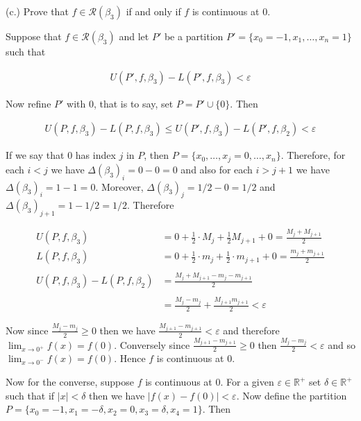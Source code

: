 \documentclass{article}
\begin{document}
  \vspace{1cm}

  {\Large \color{Sepia} (c.) Prove that $f\in\mathscr R(\beta_3)$ if and only if $f$ is continuous at 0.  }

  \vspace{1cm}

  Suppose that $f\in\mathscr R(\beta_3)$ and let $P'$ be a partition $P'=\{x_0=-1,x_1,\dots,x_n=1\}$ such that

  \begin{align*}
    U(P',f,\beta_3)-L(P',f,\beta_3)<\varepsilon
  \end{align*}

  Now refine $P'$ with $0$, that is to say, set $P=P'\cup\{0\}$.  Then

  \begin{align*}
    U(P,f,\beta_3)-L(P,f,\beta_3)\leq U(P',f,\beta_3)-L(P',f,\beta_2)<\varepsilon
  \end{align*}

  If we say that $0$ has index $j$ in $P$, then $P=\{x_0,\dots,x_j=0,\dots,x_n\}$.  Therefore, for each $i < j$ we have $\Delta(\beta_3)_i = 0-0=0$ and also for each $i>j+1$ we have $\Delta(\beta_3)_i = 1-1 = 0$.  Moreover, $\Delta(\beta_3)_{j}=1/2-0=1/2$ and $\Delta(\beta_3)_{j+1}=1-1/2=1/2$.  Therefore

  \begin{align*}
    U(P,f,\beta_3)&=0+\frac{1}{2}\cdot M_{j}+\frac 1 2 M_{j+1}+0=\frac{M_j+M_{j+1}}{2}\\
    L(P,f,\beta_3)&=0+\frac 1 2 \cdot m_{j}+\frac 1 2 \cdot m_{j+1}+0=\frac{m_{j}+m_{j+1}}{2}\\\\
    U(P,f,\beta_3)-L(P,f,\beta_2) &= \frac{M_{j}+M_{j+1}-m_{j}-m_{j+1}}{2} \\\\
    &= \frac{M_j-m_j}{2}+\frac{M_{j+1}m_{j+1}}{2}<\varepsilon
  \end{align*}

  Now since $\frac{M_j-m_j}{2}\geq 0$ then we have $\frac{M_{j+1}-m_{j+1}}{2}<\varepsilon$ and therefore $\displaystyle \lim_{x\to 0^+}f(x)=f(0)$.  Conversely since $\frac{M_{j+1}-m_{j+1}}{2}\geq 0$ then $\frac{M_{j}-m_{j}}{2} < \varepsilon$ and so $\displaystyle\lim_{x\to 0^-}f(x)=f(0)$.  Hence $f$ is continuous at 0.

  \vspace{1cm}

  Now for the converse, suppose $f$ is continuous at 0.  For a given $\varepsilon\in\mathbb R^+$ set $\delta\in\mathbb R^+$ such that if $|x|<\delta$ then we have $|f(x)-f(0)|<\varepsilon$.  Now define the partition $P=\{x_0=-1,x_1=-\delta, x_2=0,x_3=\delta,x_4=1\}$.  Then
\end{document}
